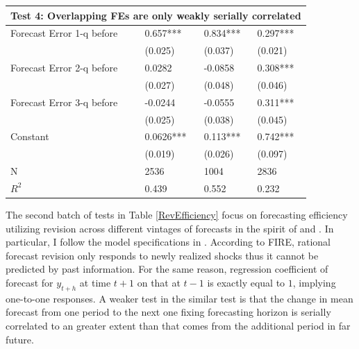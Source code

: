 \documentclass[]{article}
\begin{document}
\begin{table}[ht]
\begin{tabular}{llll}
	\hline 
	\multicolumn{4}{l}{Test 4: Overlapping FEs are only weakly serially correlated}                          \\
	\hline 
	Forecast Error 1-q before           & 0.657***         & 0.834***         & 0.297***       \\
	& (0.025)          & (0.037)          & (0.021)        \\
	Forecast Error 2-q before           & 0.0282           & -0.0858          & 0.308***       \\
	& (0.027)          & (0.048)          & (0.046)        \\
	Forecast Error 3-q before           & -0.0244          & -0.0555          & 0.311***       \\
	& (0.025)          & (0.038)          & (0.045)        \\
	Constant                            & 0.0626***        & 0.113***         & 0.742***       \\
	& (0.019)          & (0.026)          & (0.097)        \\
	\hline 
	N                                   & 2536             & 1004             & 2836           \\
	$R^2$                & 0.439            & 0.552            & 0.232    \\
	\hline      
\end{tabular}
\end{table}


The second batch of tests in Table \ref{RevEfficiency} focus on  forecasting efficiency utilizing revision across different vintages of forecasts in the spirit of \citet{nordhaus1987forecasting} and \citet{fuhrer2018intrinsic}. In particular, I follow the model specifications in \citet{fuhrer2018intrinsic}. According to FIRE, rational forecast revision only responds to newly realized shocks thus it cannot be predicted by past information. For the same reason, regression coefficient of forecast for $y_{t+h}$  at time $t+1$ on that at $t-1$ is exactly equal to $1$, implying one-to-one responses.  A weaker test in the similar test is that the change in mean forecast from one period to the next one fixing forecasting horizon is serially correlated to an greater extent than that comes from the additional period in far future. 
\end{document}
